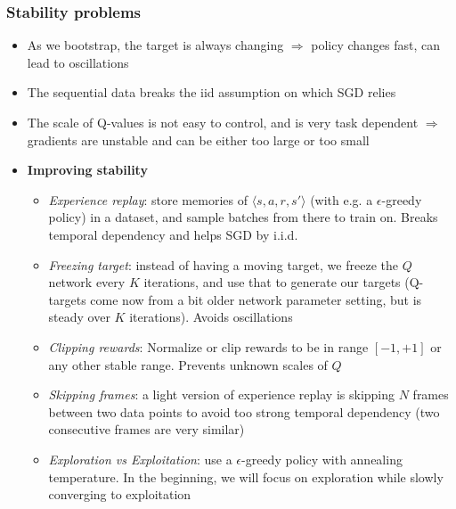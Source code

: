 \subsubsection{Stability problems}
\begin{itemize}
	\item As we bootstrap, the target is always changing $\Rightarrow$ policy changes fast, can lead to oscillations
	\item The sequential data breaks the iid assumption on which SGD relies
	\item The scale of Q-values is not easy to control, and is very task dependent $\Rightarrow$ gradients are unstable and can be either too large or too small
	\item \textbf{Improving stability}
	\begin{itemize}
		\item \textit{Experience replay}: store memories of $\langle s, a, r, s'\rangle$ (with e.g. a $\epsilon$-greedy policy) in a dataset, and sample batches from there to train on. Breaks temporal dependency and helps SGD by i.i.d.
		\item \textit{Freezing target}: instead of having a moving target, we freeze the $Q$ network every $K$ iterations, and use that to generate our targets (Q-targets come now from a bit older network parameter setting, but is steady over $K$ iterations). Avoids oscillations
		\item \textit{Clipping rewards}: Normalize or clip rewards to be in range $[-1,+1]$ or any other stable range. Prevents unknown scales of $Q$
		\item \textit{Skipping frames}: a light version of experience replay is skipping $N$ frames between two data points to avoid too strong temporal dependency (two consecutive frames are very similar)
		\item \textit{Exploration vs Exploitation}: use a $\epsilon$-greedy policy with annealing temperature. In the beginning, we will focus on exploration while slowly converging to exploitation
	\end{itemize}
\end{itemize}
